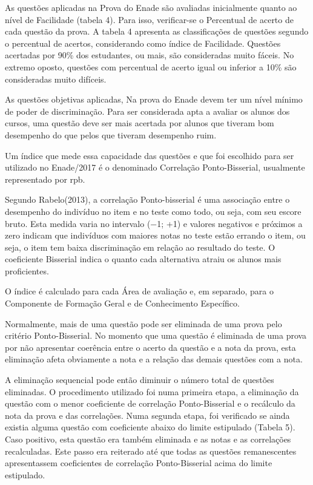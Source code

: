 \documentclass[12pt]{article}
\begin{document}
As questões aplicadas na Prova do Enade são avaliadas inicialmente quanto ao nível de Facilidade (tabela 4). Para isso, verificar-se o Percentual de acerto de cada questão da prova. A tabela 4 apresenta as classificações de questões segundo o percentual de acertos, considerando como índice de Facilidade. Questões acertadas por 90\% dos estudantes, ou mais, são consideradas muito fáceis. No extremo oposto, questões com percentual de acerto igual ou inferior a 10\% são consideradas muito difíceis.    

As questões objetivas aplicadas, Na prova do Enade devem ter um nível mínimo de poder de discriminação. Para ser considerada apta a avaliar os alunos dos cursos, uma questão deve ser mais acertada por alunos que tiveram bom desempenho do que pelos que tiveram desempenho ruim. 

Um índice que mede essa capacidade das questões e que foi escolhido para ser utilizado no Enade/2017 é o denominado Correlação Ponto-Bisserial, usualmente representado por rpb.

Segundo Rabelo(2013), a correlação Ponto-bisserial é uma associação entre o desempenho do indivíduo no item e no teste como todo, ou seja, com seu escore bruto. Esta medida varia no intervalo (−1; +1) e valores negativos e próximos a zero indicam que indivíduos com maiores notas no teste estão errando o item, ou seja, o item tem baixa discriminação em relação ao resultado do teste. O coeficiente Bisserial indica o quanto cada alternativa atraiu os alunos mais proficientes.

O índice é calculado para cada Área de avaliação e, em separado, para o Componente de Formação Geral e de Conhecimento Específico.

Normalmente, mais de uma questão pode ser eliminada de uma prova pelo critério Ponto-Bisserial. No momento que uma questão é eliminada de uma prova por não apresentar coerência entre o acerto da questão e a nota da prova, esta eliminação afeta obviamente a nota e a relação das demais questões com a nota. 

A eliminação sequencial pode então diminuir o número total de questões eliminadas. O procedimento utilizado foi numa primeira etapa, a eliminação da questão com o menor coeficiente de correlação Ponto-Bisserial e o recálculo da nota da prova e das correlações. Numa segunda etapa, foi verificado se ainda existia alguma questão com coeficiente abaixo do limite estipulado (Tabela 5). Caso positivo, esta questão era também eliminada e as notas e as correlações recalculadas. Este passo era reiterado até que todas as questões remanescentes apresentassem coeficientes de correlação Ponto-Bisserial acima do limite estipulado.
\end{document}
